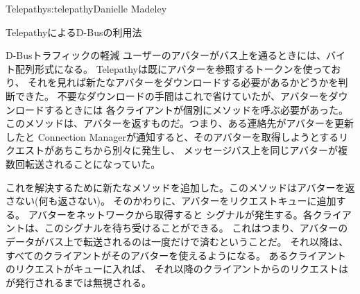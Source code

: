\begin{aosachapter}{Telepathy}{s:telepathy}{Danielle Madeley}
\begin{aosasect1}{TelepathyによるD-Busの利用法}
\begin{aosasect2}{D-Busトラフィックの軽減}
ユーザーのアバターがバス上を通るときには、バイト配列形式になる。
Telepathyは既にアバターを参照するトークンを使っており、
それを見れば新たなアバターをダウンロードする必要があるかどうかを判断できた。
不要なダウンロードの手間はこれで省けていたが、アバターをダウンロードするときには
各クライアントが個別にメソッドを呼ぶ必要があった。
このメソッドは、アバターを返すものだ。つまり、ある連絡先がアバターを更新したと
Connection Managerが通知すると、そのアバターを取得しようとするリクエストがあちこちから別々に発生し、
メッセージバス上を同じアバターが複数回転送されることになっていた。

これを解決するために新たなメソッドを追加した。このメソッドはアバターを返さない(何も返さない)。
そのかわりに、アバターをリクエストキューに追加する。
アバターをネットワークから取得すると
シグナルが発生する。各クライアントは、このシグナルを待ち受けることができる。
これはつまり、アバターのデータがバス上で転送されるのは一度だけで済むということだ。
それ以降は、すべてのクライアントがそのアバターを使えるようになる。
あるクライアントのリクエストがキューに入れば、
それ以降のクライアントからのリクエストは
が発行されるまでは無視される。


\end{aosasect2}
\end{aosasect1}
\end{aosachapter}
